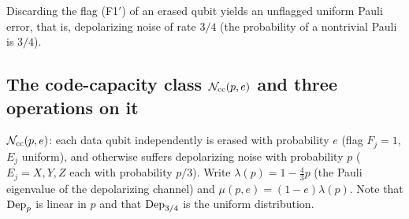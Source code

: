 \begin{corollary}[Discarding the flag = depolarizing]\label{cor:discard}
Discarding the flag (F1$'$) of an erased qubit yields an unflagged uniform Pauli error, that is, depolarizing noise of rate $3/4$ (the probability of a nontrivial Pauli is $3/4$).
\end{corollary}

\subsection{The code-capacity class $\mathcal{N}_{\rm cc}(p,e)$ and three operations on it}

\begin{definition}\label{def:Ncc}
$\mathcal{N}_{\rm cc}(p,e)$: each data qubit independently is erased with probability $e$ (flag $F_j=1$, $E_j$ uniform),
and otherwise suffers depolarizing noise with probability $p$ ($E_j=X,Y,Z$ each with probability $p/3$). Write $\lambda(p)=1-\tfrac43p$ (the Pauli eigenvalue of the depolarizing channel) and
$\mu(p,e)=(1-e)\lambda(p)$. Note that $\mathrm{Dep}_p$ is linear in $p$ and that $\mathrm{Dep}_{3/4}$ is the uniform distribution.
\end{definition}

